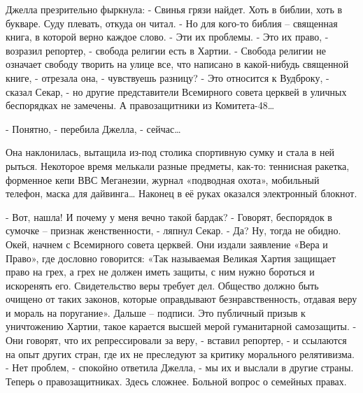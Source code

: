\documentclass{book}
\begin{document}
Джелла презрительно фыркнула:
- Свинья грязи найдет. Хоть в библии, хоть в букваре. Суду плевать, откуда он читал.
- Но для кого-то библия -- священная книга, в которой верно каждое слово.
- Эти их проблемы.
- Это их право, - возразил репортер, - свобода религии есть в Хартии.
- Свобода религии не означает свободу творить на улице все, что написано в какой-нибудь священной книге, - отрезала она, - чувствуешь разницу?
- Это относится к Вудброку, - сказал Секар, - но другие представители Всемирного совета церквей в уличных беспорядках не замечены. А правозащитники из Комитета-48\ldots{}

- Понятно, - перебила Джелла, - сейчас\ldots{}

Она наклонилась, вытащила из-под столика спортивную сумку и стала в ней рыться. Некоторое время мелькали разные предметы, как-то: теннисная ракетка, форменное кепи ВВС Меганезии, журнал «подводная охота», мобильный телефон, маска для дайвинга\ldots{} Наконец в её руках оказался электронный блокнот.

- Вот, нашла! И почему у меня вечно такой бардак?
- Говорят, беспорядок в сумочке -- признак женственности, - ляпнул Секар.
- Да? Ну, тогда не обидно. Окей, начнем с Всемирного совета церквей. Они издали заявление «Вера и Право», где дословно говорится: «Так называемая Великая Хартия защищает право на грех, а грех не должен иметь защиты, с ним нужно бороться и искоренять его. Свидетельство веры требует дел. Общество должно быть очищено от таких законов, которые оправдывают безнравственность, отдавая веру и мораль на поругание». Дальше -- подписи. Это публичный призыв к уничтожению Хартии, такое карается высшей мерой гуманитарной самозащиты.
- Они говорят, что их репрессировали за веру, - вставил репортер, - и ссылаются на опыт других стран, где их не преследуют за критику морального релятивизма.
- Нет проблем, - спокойно ответила Джелла, - мы их и выслали в другие страны. Теперь о правозащитниках. Здесь сложнее. Больной вопрос о семейных правах.
\end{document}
